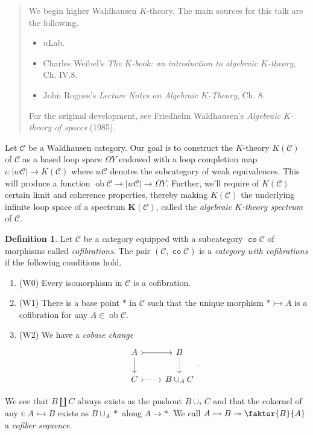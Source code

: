 \documentclass[10pt,letterpaper,cm]{nupset}
\theoremstyle{definition}
\newtheorem{definition}{Definition}
\theoremstyle{theorem}
\theoremstyle{remark}
\newcommand{\1}{\mathbf{1}}
\renewcommand{\c}{\mathscr{C}}
\newcommand{\0}{\vec 0}
\DeclareMathOperator{\co}{\mathtt{co}}
\DeclareMathOperator{\ob}{ob}
\begin{document}
\begin{abstract}
We begin higher Waldhausen $K$-theory. The main sources for this talk are the following.
\begin{itemize}
\item $n$Lab.
\item Charles Weibel's \textit{The $K$-book: an introduction to algebraic $K$-theory},  Ch. IV.8.
\item John Rognes's \textit{Lecture Notes on Algebraic $K$-Theory}, Ch. 8.
\end{itemize}
For the original development, see Friedhelm Waldhausen's \textit{Algebraic K-theory of spaces} (1985). 
\end{abstract}

\smallskip

Let $\c$ be a Waldhausen category. Our goal is to construct the $K$-theory $K(\c)$ of $\c$ as a based loop space $\Omega Y$ endowed with a loop completion map $ \iota : \left\lvert{w{\c}}\right\rvert \to K(\c)$ where $w{\c}$ denotes the subcategory of weak equivalences. This will produce a function $\ob \c \to \left\lvert{w{\c}}\right\rvert \to \Omega Y$. Further, we'll require of $K(\c)$ certain limit and coherence properties, thereby making $K(\c)$ the underlying infinite loop space of a spectrum $\mathbf{K}(\c)$, called the \textit{algebraic $K$-theory spectrum} of $\c$.


\begin{definition}
Let $\c$ be a category equipped with a subcategory $\co{\c}$ of morphisms called \textit{cofibrations}. The pair $\left(\c, \co{\c}\right)$ is a \textit{category with cofibrations} if the following conditions hold.
\begin{enumerate}
\item (W0) Every isomorphism in $\c$ is a cofibration.
\item (W1) There is a base point $\ast$ in $\c$ such that the unique morphism $\ast \rightarrowtail A$ is a cofibration for any $A \in \ob \c$.
\item (W2) We have a \textit{cobase change}
\[
\begin{tikzcd}
A \arrow[d] \arrow[r, tail] & B \arrow[d, dotted] \\
C \arrow[r, dotted, tail] & B \cup_A C
\end{tikzcd}.
\]
\end{enumerate}
\end{definition}


We see that $B \coprod C$ always exists as the pushout $B \cup_{\ast} C$ and that the cokernel of any $i : A \rightarrowtail B$ exists as $B \cup_A \ast$ along $A \to \ast$. We call $A \rightarrowtail  B \twoheadrightarrow \faktor{B}{A}$ a \textit{cofiber sequence}.
\end{document}
